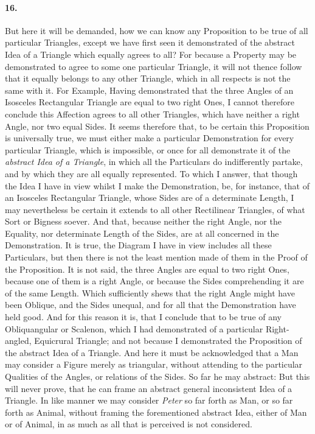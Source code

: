 \documentclass[]{article}
\newenvironment{sectionbody}{\begin{multicols}{2}}{\end{multicols}}
\begin{document}
\begin{sectionbody}
\paragraph{16.} But here it will be demanded, how we can know any Proposition to
be true of all particular Triangles, except we have first seen it
demonstrated of the abstract Idea of a Triangle which equally
agrees to all? For because a Property may be demonstrated to
agree to some one particular Triangle, it will not thence follow
that it equally belongs to any other Triangle, which in all
respects is not the same with it.  For Example, Having
demonstrated that the three Angles of an Isosceles Rectangular
Triangle are equal to two right Ones, I cannot therefore conclude
this Affection agrees to all other Triangles, which have neither
a right Angle, nor two equal Sides.  It seems therefore that, to
be certain this Proposition is universally true, we must either
make a particular Demonstration for every particular Triangle,
which is impossible, or once for all demonstrate it of the
\emph{abstract Idea of a Triangle}, in which all the
Particulars do indifferently partake, and by which they are all
equally represented.  To which I answer, that though the Idea I
have in view whilst I make the Demonstration, be, for instance,
that of an Isosceles Rectangular Triangle, whose Sides are of a
determinate Length, I may nevertheless be certain it extends to
all other Rectilinear Triangles, of what Sort or Bigness soever.
And that, because neither the right Angle, nor the Equality, nor
determinate Length of the Sides, are at all concerned in the
Demonstration.  It is true, the Diagram I have in view includes
all these Particulars, but then there is not the least mention
made of them in the Proof of the Proposition.  It is not said,
the three Angles are equal to two right Ones, because one of them
is a right Angle, or because the Sides comprehending it are of
the same Length.  Which sufficiently shews that the right Angle
might have been Oblique, and the Sides unequal, and for all that
the Demonstration have held good.  And for this reason it is,
that I conclude that to be true of any Obliquangular or Scalenon,
which I had demonstrated of a particular Right-angled, Equicrural
Triangle; and not because I demonstrated the Proposition of the
abstract Idea of a Triangle.  And here it must be acknowledged
that a Man may consider a Figure merely as triangular, without
attending to the particular Qualities of the Angles, or relations
of the Sides.  So far he may abstract: But this will never prove,
that he can frame an abstract general inconsistent Idea of a
Triangle.  In like manner we may consider \emph{Peter} so far
forth as Man, or so far forth as Animal, without framing the
forementioned abstract Idea, either of Man or of Animal, in as
much as all that is perceived is not considered.




\end{sectionbody}
\end{document}
